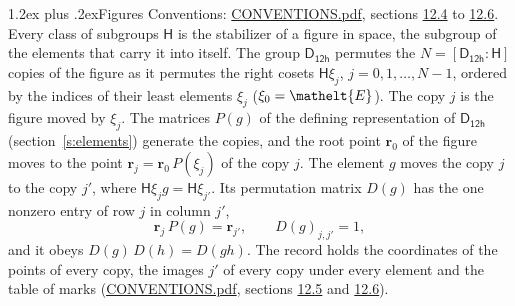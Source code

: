 \documentclass[10pt,a4paper]{article}
\makeatletter
\renewcommand\section{\@startsection{section}{1}{\z@}{-3ex plus -1ex minus -.2ex}%
  {1.2ex plus .2ex}{\normalfont\large\sffamily\bfseries\color{parttitle}}}
\numberwithin{equation}{section}
\newcommand{\eltfont}[1]{{\let\sigma\eltsigma\mathelt{#1}}}
\newcommand{\grp}[1]{\mathsf{#1}}
\newcommand{\cls}[1]{\eltfont{#1}}
\newcommand{\pointr}{\mathbf{r}}
\makeatother
\begin{document}
\section{Figures}\label{s:permutation}
Conventions: \href{../../CONVENTIONS.pdf}{CONVENTIONS.pdf}, sections \href{../../CONVENTIONS.pdf\#conv.12.4}{12.4} to \href{../../CONVENTIONS.pdf\#conv.12.6}{12.6}.
Every class of subgroups $\grp{H}$ is the stabilizer of a figure in space, the subgroup of the elements that carry it into itself. \label{n:local.orbit.size}\label{n:element.coset.least}\label{n:index.coset}The group $\grp{D_{12h}}$ permutes the $N = [\grp{D_{12h}} : \grp{H}]$ copies of the figure as it permutes the right cosets $\grp{H}\xi_j$, $j = 0, 1, \dots, N - 1$, ordered by the indices of their least elements $\xi_j$ ($\xi_0 = \cls{E}$). The copy $j$ is the figure moved by $\xi_j$. The matrices $P(g)$ of the defining representation of $\grp{D_{12h}}$ (section~\ref{s:elements}) generate the copies, and the root point $\pointr_0$ of the figure moves to the point $\pointr_j = \pointr_0\, P(\xi_j)$ of the copy $j$. \label{n:local.coset.image}The element $g$ moves the copy $j$ to the copy $j'$, where $\grp{H}\xi_j g = \grp{H}\xi_{j'}$. \label{n:local.matrix.permutation}Its permutation matrix $D(g)$ has the one nonzero entry of row $j$ in column $j'$,
\begin{equation}\label{e:perm.matrix}\pointr_j\, P(g) = \pointr_{j'}, \qquad D(g)_{j,j'} = 1,\end{equation}
and it obeys $D(g)\, D(h) = D(gh)$. The record holds the coordinates of the points of every copy, the images $j'$ of every copy under every element and the table of marks (\href{../../CONVENTIONS.pdf}{CONVENTIONS.pdf}, sections \href{../../CONVENTIONS.pdf\#conv.12.5}{12.5} and \href{../../CONVENTIONS.pdf\#conv.12.6}{12.6}).
\end{document}
